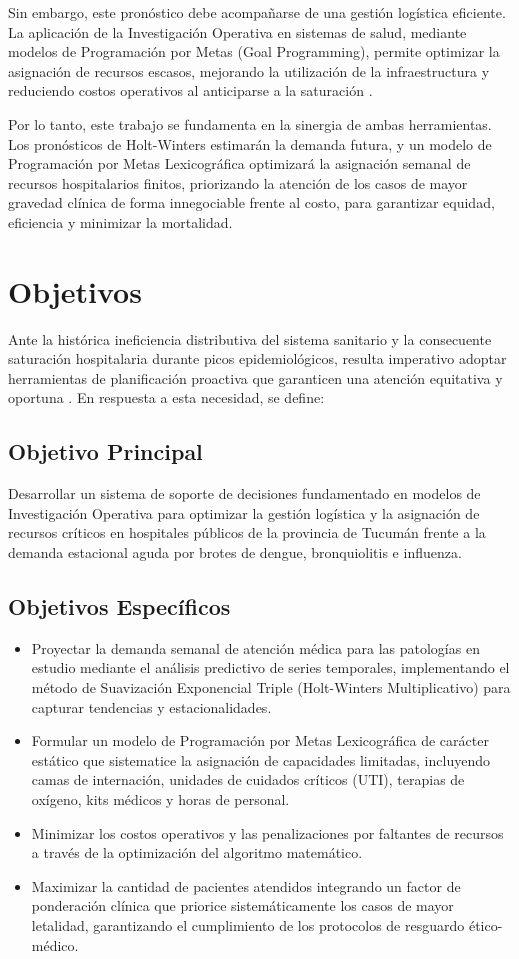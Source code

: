 \documentclass[conference]{IEEEtran}
\begin{document}
Sin embargo, este pronóstico debe acompañarse de una gestión logística eficiente. La aplicación de la Investigación Operativa en sistemas de salud, mediante modelos de Programación por Metas (Goal Programming), permite optimizar la asignación de recursos escasos, mejorando la utilización de la infraestructura y reduciendo costos operativos al anticiparse a la saturación \cite{ref4, ref5}.

Por lo tanto, este trabajo se fundamenta en la sinergia de ambas herramientas. Los pronósticos de Holt-Winters estimarán la demanda futura, y un modelo de Programación por Metas Lexicográfica optimizará la asignación semanal de recursos hospitalarios finitos, priorizando la atención de los casos de mayor gravedad clínica de forma innegociable frente al costo, para garantizar equidad, eficiencia y minimizar la mortalidad.

\section{Objetivos}
Ante la histórica ineficiencia distributiva del sistema sanitario y la consecuente saturación hospitalaria durante picos epidemiológicos, resulta imperativo adoptar herramientas de planificación proactiva que garanticen una atención equitativa y oportuna \cite{ref6}. En respuesta a esta necesidad, se define:

\subsection{Objetivo Principal}
Desarrollar un sistema de soporte de decisiones fundamentado en modelos de Investigación Operativa para optimizar la gestión logística y la asignación de recursos críticos en hospitales públicos de la provincia de Tucumán frente a la demanda estacional aguda por brotes de dengue, bronquiolitis e influenza.

\subsection{Objetivos Específicos}
\begin{itemize}
    \item Proyectar la demanda semanal de atención médica para las patologías en estudio mediante el análisis predictivo de series temporales, implementando el método de Suavización Exponencial Triple (Holt-Winters Multiplicativo) para capturar tendencias y estacionalidades.
    \item Formular un modelo de Programación por Metas Lexicográfica de carácter estático que sistematice la asignación de capacidades limitadas, incluyendo camas de internación, unidades de cuidados críticos (UTI), terapias de oxígeno, kits médicos y horas de personal.
    \item Minimizar los costos operativos y las penalizaciones por faltantes de recursos a través de la optimización del algoritmo matemático.
    \item Maximizar la cantidad de pacientes atendidos integrando un factor de ponderación clínica que priorice sistemáticamente los casos de mayor letalidad, garantizando el cumplimiento de los protocolos de resguardo ético-médico.
\end{itemize}
\end{document}
